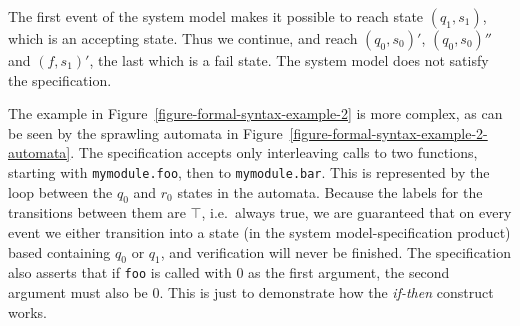 The first event of the system model makes it possible to reach state
$(q_1,s_1)$, which is an accepting state. Thus we continue, and reach
$(q_0,s_0)'$, $(q_0,s_0)''$ and $(f,s_1)'$, the last which is a fail state. The
system model does not satisfy the specification.

The example in Figure~\ref{figure-formal-syntax-example-2} is more complex, as
can be seen by the sprawling automata in
Figure~\ref{figure-formal-syntax-example-2-automata}. The specification accepts
only interleaving calls to two functions, starting with \texttt{mymodule.foo},
then to \texttt{mymodule.bar}. This is represented by the loop between the
$q_0$ and $r_0$ states in the automata. Because the labels for the transitions
between them are $\top$, i.e.\ always true, we are guaranteed that on every
event we either transition into a state (in the system model-specification
product) based containing $q_0$ or $q_1$, and verification will never be
finished. The specification also asserts that if \texttt{foo} is called with
$0$ as the first argument, the second argument must also be $0$.  This is just
to demonstrate how the \textit{if-then} construct works.



